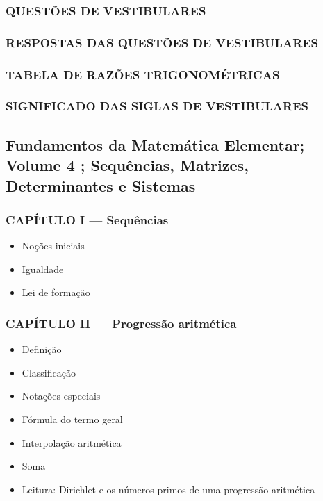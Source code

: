 \documentclass[a4paper,12pt]{article}[abntex2]
\begin{document}
\subsubsection*{QUESTÕES DE VESTIBULARES}

\subsubsection*{RESPOSTAS DAS QUESTÕES DE VESTIBULARES}

\subsubsection*{TABELA DE RAZÕES TRIGONOMÉTRICAS}

\subsubsection*{SIGNIFICADO DAS SIGLAS DE VESTIBULARES }

 \subsection{Fundamentos da Matemática Elementar; Volume 4 ; Sequências, Matrizes, Determinantes e Sistemas}

\subsubsection*{CAPÍTULO I — Sequências}

\begin{itemize}
\item Noções iniciais
\item Igualdade
\item Lei de formação
\end{itemize}
\subsubsection*{CAPÍTULO II — Progressão aritmética}

\begin{itemize}
\item Definição
\item Classificação
\item Notações especiais
\item Fórmula do termo geral
\item Interpolação aritmética
\item Soma
\item Leitura: Dirichlet e os números primos de uma progressão aritmética
\end{itemize}
\end{document}
